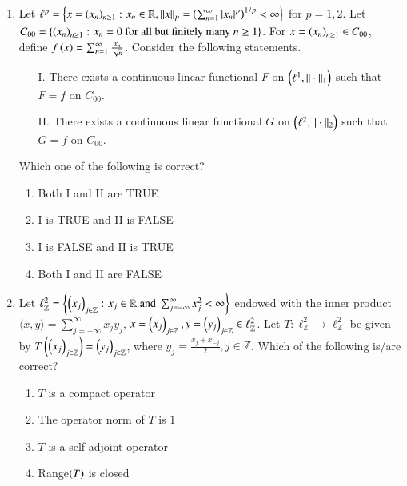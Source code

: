 \documentclass[journal,12pt,onecolumn]{IEEEtran}
\theoremstyle{remark}
\begin{document}
\begin{enumerate}
\item Let $\ell^p = \left\{ x = \left(x_n\right)_{n\ge 1} \colon x_n \in \mathbb{R}, \|x\|_p = \left(\sum_{n=1}^\infty \left\vert x_n\right\vert^p\right)^{1/p} < \infty \right\}$ for $p=1, 2$. Let $C_{00} = \{\left(x_n\right)_{n\ge 1} \colon x_n = 0 \text{ for all but finitely many } n \ge 1\}$. For $x = \left(x_n\right)_{n\ge 1} \in C_{00}$, define $f\left(x\right) = \sum_{n=1}^\infty \frac{x_n}{\sqrt{n}}$. Consider the following statements.
\begin{enumerate}
    \item[I.] There exists a continuous linear functional $F$ on $\left(\ell^1, \|\cdot\|_1\right)$ such that $F=f$ on $C_{00}$.
    \item[II.] There exists a continuous linear functional $G$ on $\left(\ell^2, \|\cdot\|_2\right)$ such that $G=f$ on $C_{00}$.
\end{enumerate}
Which one of the following is correct? \hfill{}
\begin{enumerate}
    \item Both I and II are TRUE
    \item I is TRUE and II is FALSE
    \item I is FALSE and II is TRUE
    \item Both I and II are FALSE
\end{enumerate}

\item Let $\ell^2_{\mathbb{Z}} = \left\{ \left(x_j\right)_{j \in \mathbb{Z}} \colon x_j \in \mathbb{R} \text{ and } \sum_{j=-\infty}^\infty x_j^2 < \infty \right\}$ endowed with the inner product $\langle x, y \rangle = \sum_{j=-\infty}^\infty x_j y_j$, $x = \left(x_j\right)_{j \in \mathbb{Z}}, y = \left(y_j\right)_{j \in \mathbb{Z}} \in \ell^2_{\mathbb{Z}}$. Let $T \colon \ell^2_{\mathbb{Z}} \to \ell^2_{\mathbb{Z}}$ be given by $T\left(\left(x_j\right)_{j \in \mathbb{Z}}\right) = \left(y_j\right)_{j \in \mathbb{Z}}$, where $y_j = \frac{x_j + x_{-j}}{2}, j \in \mathbb{Z}$. Which of the following is/are correct? \hfill{}
\begin{enumerate}
    \item $T$ is a compact operator
    \item The operator norm of $T$ is $1$
    \item $T$ is a self-adjoint operator
    \item Range$\left(T\right)$ is closed
\end{enumerate}


\end{enumerate}
\end{document}
